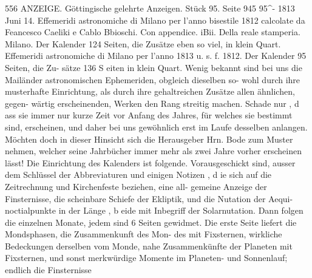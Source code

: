 \documentclass[12pt,a4paper]{article}
\begin{document}
\newpage
556 ANZEIGE.\newline
Göttingische gelehrte Anzeigen. Stück 95. Seite 945 \textbullet{}\textbullet{} 95\^{}- 1813 Juni 14.\newline
Effemeridi astronomiche di Milano per l'anno bisestile 1812 calcolate da Feancesco Caeliki e Cablo\newline
Bbioschi. Con appendice. iBii. Della reale stamperia. Milano. Der Kalender 124 Seiten, die Zusätze\newline
eben so viel, in klein Quart.\newline
Effemeridi astronomiche di Milano per l'anno 1813 u. s. f. 1812. Der Kalender 95 Seiten, die Zu-\newline
sätze 136 S eiten in klein Quart.\newline
Wenig bekannt sind bei uns die Mailänder astronomischen Ephemeriden, obgleich dieselben so-\newline
wohl durch ihre musterhafte Einrichtung, als durch ihre gehaltreichen Zusätze allen ähnlichen, gegen-\newline
wärtig erscheinenden, Werken den Rang streitig machen. Schade nur , d ass sie immer nur kurze Zeit\newline
vor Anfang des Jahres, für welches sie bestimmt sind, erscheinen, und daher bei uns gewöhnlich erst\newline
im Laufe desselben anlangen. Möchten doch in dieser Hinsicht sich die Herausgeber Hrn. Bode zum\newline
Muster nehmen, welcher seine Jahrbücher immer mehr als zwei Jahre vorher erscheinen lässt!\newline
Die Einrichtung des Kalenders ist folgende. Vorausgeschickt sind, ausser dem Schlüssel der\newline
Abbreviaturen und einigen Notizen , d ie sich auf die Zeitrechnung und Kirchenfeste beziehen, eine all-\newline
gemeine Anzeige der Finsternisse, die scheinbare Schiefe der Ekliptik, und die Nutation der Aequi-\newline
noctialpunkte in der Länge , b eide mit Inbegriff der Solarnutation. Dann folgen die einzelnen Monate,\newline
jedem sind 6 Seiten gewidmet. Die erste Seite liefert die Mondsphasen, die Zusammenkunft des Mon-\newline
des mit Fixsternen, wirkliche Bedeckungen derselben vom Monde, nahe Zusammenkünfte der Planeten\newline
mit Fixsternen, und sonst merkwürdige Momente im Planeten- und Sonnenlauf; endlich die Finsternisse\newline
\end{document}
